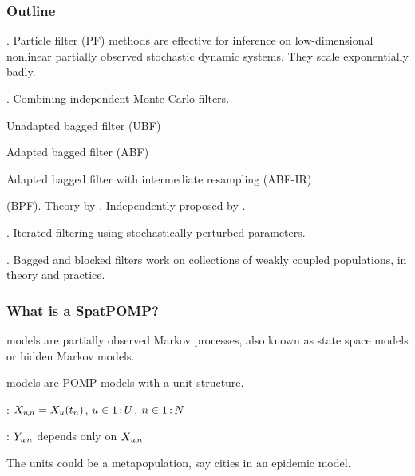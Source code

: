 \documentclass{beamer}
\begin{document}
\newcommand\challengeSep{\vspace{3mm}}


\begin{frame}
  \frametitle{Outline}

  
  . Particle filter (PF) methods are effective for inference on low-dimensional nonlinear partially observed stochastic dynamic systems. They scale exponentially badly.

  \challengeSep
  
  . Combining independent Monte Carlo filters.

  \vspace{1mm}
  
  \begin{myitemize}
  \item Unadapted bagged filter (UBF)
  \item Adapted bagged filter (ABF)
    \item Adapted bagged filter with intermediate resampling (ABF-IR)
  \end{myitemize}

  \challengeSep

   (BPF). Theory by \citet{rebeschini15}. Independently proposed by \citet{ng02}.

  \challengeSep

  . Iterated filtering using stochastically perturbed parameters.

  \challengeSep

  . Bagged and blocked filters work on collections of weakly coupled populations, in theory and practice.

\end{frame}

\begin{frame}

  \frametitle{What is a SpatPOMP?}

   models are partially observed Markov processes, also known as state space models or hidden Markov models.

  \vspace{6mm}
  
   models are POMP models with a unit structure.

    \vspace{6mm}
 
  : $X_{u{\hspace{-0.25mm},\hspace{-0.2mm}}n}=X_{u}(t_n)$, \hspace{1mm} $u\in 1{{\hspace{0.6mm}:\hspace{0.6mm}}}U$, \hspace{1mm} $n\in 1{{\hspace{0.6mm}:\hspace{0.6mm}}}N$

    \vspace{6mm}
 
  : $Y_{u{\hspace{-0.25mm},\hspace{-0.2mm}}n}$ depends only on $X_{u{\hspace{-0.25mm},\hspace{-0.2mm}}n}$

    \vspace{6mm}
 
The units could be a metapopulation, say cities in an epidemic model.

\end{frame}
\end{document}
